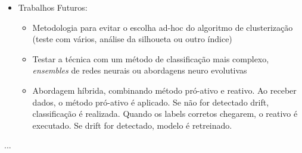 \documentclass[qual, classic, a4paper]{ufbathesis}
\begin{document}
\begin{itemize}
    \item Trabalhos Futuros:
    \begin{itemize}
        \item Metodologia para evitar o escolha ad-hoc do algoritmo de clusterização (teste com vários, análise da silhoueta ou outro índice)
        \item Testar a técnica com um método de classificação mais complexo, \textit{ensembles} de redes neurais ou abordagens neuro evolutivas
        \item Abordagem híbrida, combinando método pró-ativo e reativo. Ao receber dados, o método pró-ativo é aplicado. Se não for detectado drift, classificação é realizada. Quando os labels corretos chegarem, o reativo é executado. Se drift for detectado, modelo é retreinado.
    \end{itemize}

\end{itemize}


...

\backmatter




\end{document}

